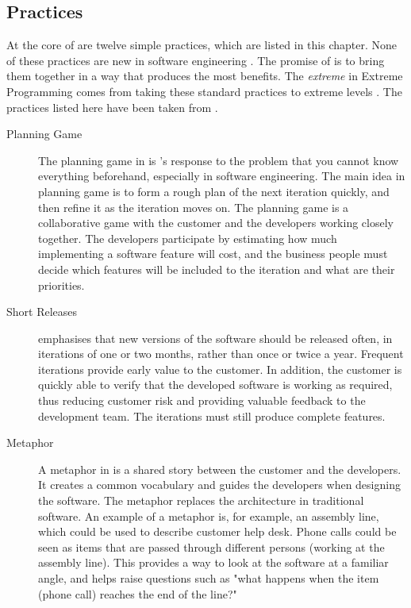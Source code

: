 \subsection{Practices}
\label{toc:agile:xp:practices}

At the core of  are twelve simple practices, which are 
listed in this chapter. None of these practices are new in software 
engineering \citep{xpexplained}. The promise of  is to 
bring them together in a way that produces the most benefits. The 
\textsl{extreme} in Extreme Programming comes from taking these 
standard practices to extreme levels \citep{agilesdm}. The practices 
listed here have been taken from 
\citep{xpapplied,xpexplained,agilesd,rapidxp}.

\begin{description}
\item[Planning Game] The planning game in  is 's 
response to the problem that you cannot know everything beforehand, 
especially in software engineering. The main idea in planning game is 
to form a rough plan of the next iteration quickly, and then refine it 
as the iteration moves on. The planning game is a collaborative game 
with the customer and the developers working closely together. The 
developers participate by estimating how much implementing a software 
feature will cost, and the business people must decide which features 
will be included to the iteration and what are their priorities.

\item[Short Releases]  emphasises that new versions of the 
software should be released often, in iterations of one or two months, 
rather than once or twice a year. Frequent iterations provide early 
value to the customer. In addition, the customer is quickly able to 
verify that the developed software is working as required, thus 
reducing customer risk and providing valuable feedback to the 
development team. The iterations must still produce complete features.

\item[Metaphor] A metaphor in  is a shared story between 
the customer and the developers. It creates a common vocabulary and 
guides the developers when designing the software. The  
metaphor replaces the architecture in traditional software. An example 
of a metaphor is, for example, an assembly line, which could be used 
to describe customer help desk. Phone calls could be seen as items 
that are passed through different persons (working at the assembly 
line). This provides a way to look at the software at a familiar 
angle, and helps raise questions such as "what happens when the item 
(phone call) reaches the end of the line?"


\end{description}
